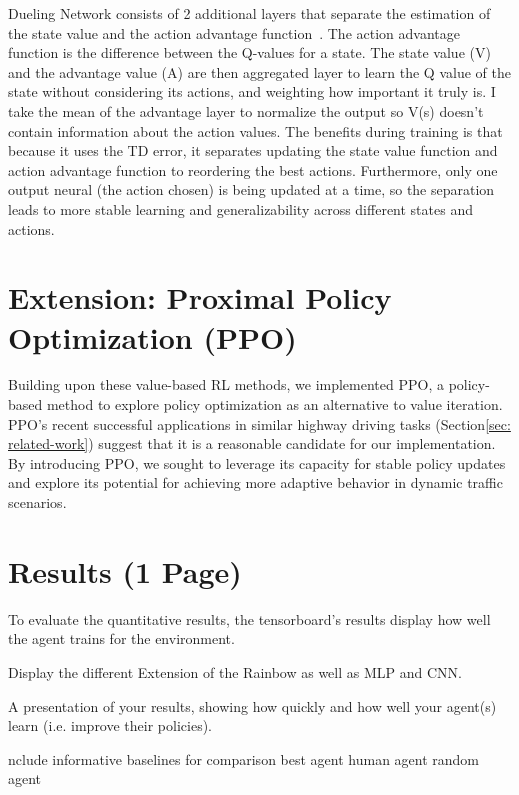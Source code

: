 \documentclass{article}
\begin{document}
Dueling Network consists of 2 additional layers that separate the estimation of the state value and the action advantage function~\cite{wang_dueling_2016}.
The action advantage function is the difference between the Q-values for a state.
The state value (V) and the advantage value (A) are then aggregated layer to learn the Q value of the state without considering its actions, and weighting how important it truly is.
I take the mean of the advantage layer to normalize the output so V(s) doesn't contain information about the action values.
The benefits during training is that because it uses the TD error, it separates updating the state value function and action advantage function to reordering the best actions.
Furthermore, only one output neural (the action chosen) is being updated at a time, so the separation leads to more stable learning and generalizability across different states and actions.

\section{Extension: Proximal Policy Optimization (PPO)}
Building upon these value-based RL methods, we implemented PPO, a policy-based method to explore policy optimization as an alternative to value iteration. 
PPO's recent successful applications in similar highway driving tasks (Section\ref{sec: related-work}) suggest that it is a reasonable candidate for our implementation. 
By introducing PPO, we sought to leverage its capacity for stable policy updates and explore its potential for achieving more adaptive behavior in dynamic traffic scenarios.




\section{Results (1 Page)}
To evaluate the quantitative results, the tensorboard's results display how well the agent trains for the environment.

Display the different Extension of the Rainbow as well as MLP and CNN.

A presentation of your results, showing how quickly and how well your agent(s) learn (i.e. improve their policies).

nclude informative baselines for comparison 
best agent
human agent
random agent

\end{document}
